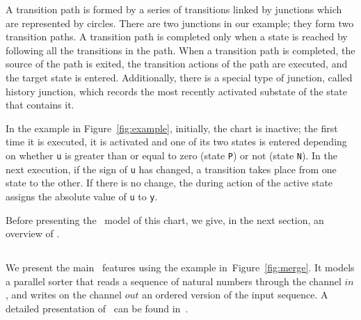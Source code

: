 \documentclass[submission]{eptcs}
\begin{document}
A transition path is formed by a series of transitions linked by junctions which are represented by circles. There are two junctions in our example; they form two transition paths. A transition path is completed only when a state is reached by following all the transitions in the path. When a transition path is completed, the source of the path is exited, the transition actions of the path are executed, and the target state is entered. Additionally, there is a special type of junction, called history junction, which records the most recently activated substate of the state that contains it.

In the example in Figure~\ref{fig:example}, initially, the chart is inactive; the first time it is executed, it is activated and one of its two states is entered depending on whether \texttt{u} is greater than or equal to zero (state \texttt{P}) or not (state \texttt{N}). In the next execution, if the sign of \texttt{u} has changed, a transition takes place from one state to the other. If there is no change, the during action of the active state assigns the absolute value of \texttt{u} to \texttt{y}.

Before presenting the \Circus~model of this chart, we give, in the next section, an overview of \Circus.

\subsection{\Circus}

We present the main \Circus\ features using the example in~Figure~\ref{fig:merge}. It models a parallel sorter that reads a sequence of natural numbers through the channel $in$, and writes on the channel $out$ an ordered version of the input sequence. A detailed presentation of \Circus\ can be found in~\cite{Woodcock2002}.
\end{document}
